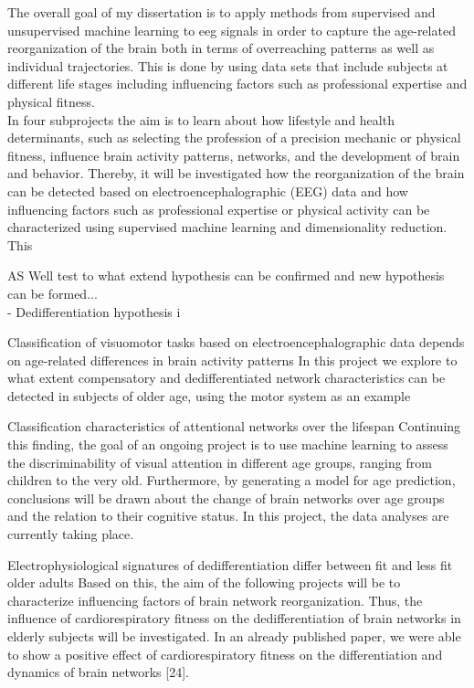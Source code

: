 The overall goal of my dissertation is to apply methods from supervised and unsupervised machine learning to \gls{eeg} signals in order to capture the age-related reorganization of the brain both in terms of overreaching patterns as well as individual trajectories. This is done by using data sets that include subjects at different life stages including influencing factors such as professional expertise and physical fitness.\\
In four subprojects the aim is to learn about how lifestyle and health determinants, such as selecting the profession of a precision mechanic or physical fitness, influence brain activity patterns, networks, and the development of brain and behavior. Thereby, it will be investigated how the reorganization of the brain can be detected based on electroencephalographic (EEG) data and how influencing factors such as professional expertise or physical activity can be characterized using supervised machine learning and dimensionality reduction. This 


AS Well test to what extend hypothesis can be confirmed and new hypothesis can be formed...\\
- Dedifferentiation hypothesis i



Classification of visuomotor tasks based on electroencephalographic data depends on age-related differences in brain activity patterns 
In this project we explore to what extent compensatory and dedifferentiated network characteristics can be detected in subjects of older age, using the motor system as an example


Classification characteristics of attentional networks over the lifespan
Continuing this finding, the goal of an ongoing project is to use machine learning to assess the discriminability of visual attention in different age groups, ranging from children to the very old. Furthermore, by generating a model for age prediction, conclusions will be drawn about the change of brain networks over age groups and the relation to their cognitive status. In this project, the data analyses are currently taking place.

Electrophysiological signatures of dedifferentiation differ between fit and less fit older adults
Based on this, the aim of the following projects will be to characterize influencing factors of brain network reorganization. Thus, the influence of cardiorespiratory fitness on the dedifferentiation of brain networks in elderly subjects will be investigated. In an already published paper, we were able to show a positive effect of cardiorespiratory fitness on the differentiation and dynamics of brain networks [24]. 


